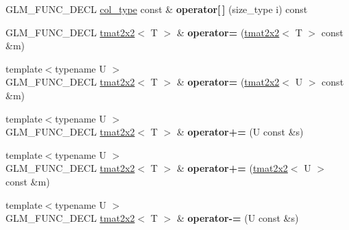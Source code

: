 \begin{DoxyCompactItemize}
\item 
\hypertarget{structglm_1_1detail_1_1tmat2x2_a074e61b27b42d0678fbb7edf85483edb}{G\-L\-M\-\_\-\-F\-U\-N\-C\-\_\-\-D\-E\-C\-L \hyperlink{structglm_1_1detail_1_1tvec2}{col\-\_\-type} const \& {\bfseries operator\mbox{[}$\,$\mbox{]}} (size\-\_\-type i) const }\label{structglm_1_1detail_1_1tmat2x2_a074e61b27b42d0678fbb7edf85483edb}

\item 
\hypertarget{structglm_1_1detail_1_1tmat2x2_a9df009dce8bbc63128b7c75f8f3a64f4}{G\-L\-M\-\_\-\-F\-U\-N\-C\-\_\-\-D\-E\-C\-L \hyperlink{structglm_1_1detail_1_1tmat2x2}{tmat2x2}$<$ T $>$ \& {\bfseries operator=} (\hyperlink{structglm_1_1detail_1_1tmat2x2}{tmat2x2}$<$ T $>$ const \&m)}\label{structglm_1_1detail_1_1tmat2x2_a9df009dce8bbc63128b7c75f8f3a64f4}

\item 
\hypertarget{structglm_1_1detail_1_1tmat2x2_a160e32c3fb95140823bf63efc757a635}{{\footnotesize template$<$typename U $>$ }\\G\-L\-M\-\_\-\-F\-U\-N\-C\-\_\-\-D\-E\-C\-L \hyperlink{structglm_1_1detail_1_1tmat2x2}{tmat2x2}$<$ T $>$ \& {\bfseries operator=} (\hyperlink{structglm_1_1detail_1_1tmat2x2}{tmat2x2}$<$ U $>$ const \&m)}\label{structglm_1_1detail_1_1tmat2x2_a160e32c3fb95140823bf63efc757a635}

\item 
\hypertarget{structglm_1_1detail_1_1tmat2x2_a1bcaf856c6b8eefbc44c2158101ce292}{{\footnotesize template$<$typename U $>$ }\\G\-L\-M\-\_\-\-F\-U\-N\-C\-\_\-\-D\-E\-C\-L \hyperlink{structglm_1_1detail_1_1tmat2x2}{tmat2x2}$<$ T $>$ \& {\bfseries operator+=} (U const \&s)}\label{structglm_1_1detail_1_1tmat2x2_a1bcaf856c6b8eefbc44c2158101ce292}

\item 
\hypertarget{structglm_1_1detail_1_1tmat2x2_a378a8fa1e71d81d423f619271751d3e4}{{\footnotesize template$<$typename U $>$ }\\G\-L\-M\-\_\-\-F\-U\-N\-C\-\_\-\-D\-E\-C\-L \hyperlink{structglm_1_1detail_1_1tmat2x2}{tmat2x2}$<$ T $>$ \& {\bfseries operator+=} (\hyperlink{structglm_1_1detail_1_1tmat2x2}{tmat2x2}$<$ U $>$ const \&m)}\label{structglm_1_1detail_1_1tmat2x2_a378a8fa1e71d81d423f619271751d3e4}

\item 
\hypertarget{structglm_1_1detail_1_1tmat2x2_af74e7c76c58ae2e2a59d0ff1db7fbe6e}{{\footnotesize template$<$typename U $>$ }\\G\-L\-M\-\_\-\-F\-U\-N\-C\-\_\-\-D\-E\-C\-L \hyperlink{structglm_1_1detail_1_1tmat2x2}{tmat2x2}$<$ T $>$ \& {\bfseries operator-\/=} (U const \&s)}\label{structglm_1_1detail_1_1tmat2x2_af74e7c76c58ae2e2a59d0ff1db7fbe6e}


\end{DoxyCompactItemize}
